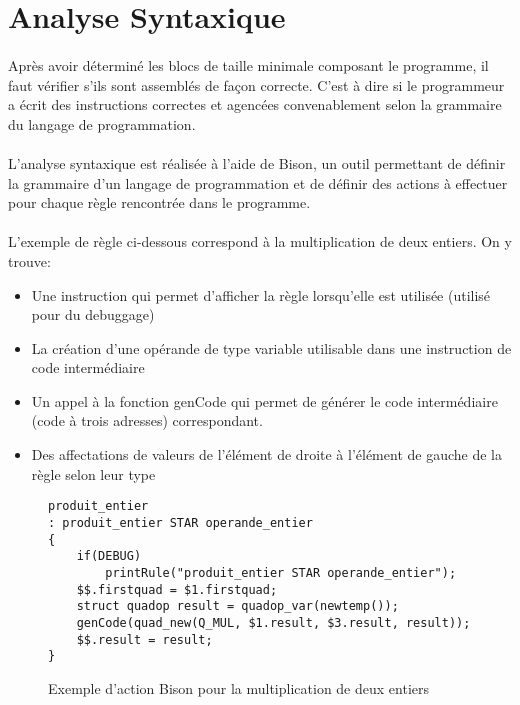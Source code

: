 \section{Analyse Syntaxique}

\paragraph{}
Après avoir déterminé les blocs de taille minimale composant le programme, il faut vérifier s'ils sont assemblés de façon correcte. C'est à dire si le programmeur a écrit des instructions correctes et agencées convenablement selon la grammaire du langage de programmation.

\paragraph{}
L'analyse syntaxique est réalisée à l'aide de \textsf{Bison}, un outil permettant de définir la grammaire d'un langage de programmation et de définir des actions à effectuer pour chaque règle rencontrée dans le programme.

\paragraph{}
L'exemple de règle ci-dessous correspond à la multiplication de deux entiers. On y trouve:
\begin{itemize}
    \item Une instruction qui permet d'afficher la règle lorsqu'elle est utilisée (utilisé pour du debuggage)
    \item La création d'une opérande de type variable utilisable dans une instruction de code intermédiaire
    \item Un appel à la fonction \textsf{genCode} qui permet de générer le code intermédiaire (code à trois adresses) correspondant.
    \item Des affectations de valeurs de l'élément de droite à l'élément de gauche de la règle selon leur type
\end{itemize}
\begin{figure}[H]
\begin{lstlisting}
produit_entier
: produit_entier STAR operande_entier
{
    if(DEBUG)
        printRule("produit_entier STAR operande_entier");
    $$.firstquad = $1.firstquad;
    struct quadop result = quadop_var(newtemp());
    genCode(quad_new(Q_MUL, $1.result, $3.result, result));
    $$.result = result;
}
\end{lstlisting}
\caption{Exemple d'action \textsf{Bison} pour la multiplication de deux entiers}
\end{figure}

